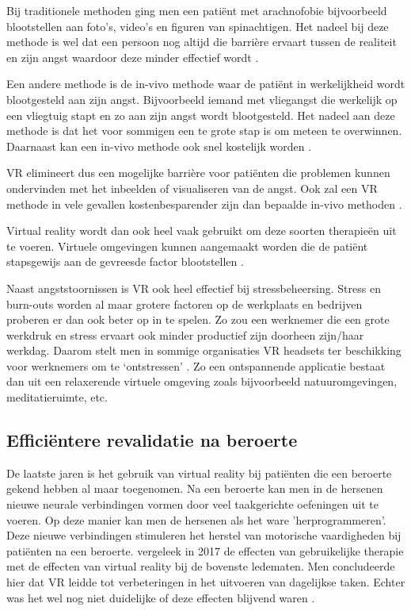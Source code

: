 Bij traditionele methoden ging men een patiënt met arachnofobie bijvoorbeeld blootstellen aan foto’s, video’s en figuren van spinachtigen. Het nadeel bij deze methode is wel dat een persoon nog altijd die barrière ervaart tussen de realiteit en zijn angst waardoor deze minder effectief wordt \autocite{Keller2018}.

Een andere methode is de in-vivo methode waar de patiënt in werkelijkheid wordt blootgesteld aan zijn angst. Bijvoorbeeld iemand met vliegangst die werkelijk op een vliegtuig stapt en zo aan zijn angst wordt blootgesteld. Het nadeel aan deze methode is dat het voor sommigen een te grote stap is om meteen te overwinnen. Daarnaast kan een in-vivo methode ook snel kostelijk worden \autocite{Keller2018}.

VR elimineert dus een mogelijke barrière voor patiënten die problemen kunnen ondervinden met het inbeelden of visualiseren van de angst. Ook zal een VR methode in vele gevallen kostenbesparender zijn dan bepaalde in-vivo methoden \autocite{Keller2018}.

Virtual reality wordt dan ook heel vaak gebruikt om deze soorten therapieën uit te voeren. Virtuele omgevingen kunnen aangemaakt worden die de patiënt stapsgewijs aan de gevreesde factor blootstellen \autocite{Keller2018}.

Naast angststoornissen is VR ook heel effectief bij stressbeheersing. Stress en burn-outs worden al maar grotere factoren op de werkplaats en bedrijven proberen er dan ook beter op in te spelen. Zo zou een werknemer die een grote werkdruk en stress ervaart ook minder productief zijn doorheen zijn/haar werkdag. Daarom stelt men in sommige organisaties VR headsets ter beschikking voor werknemers om te ‘ontstressen’ \autocite{Thoondee2017}.  
Zo een ontspannende applicatie bestaat dan uit een relaxerende virtuele omgeving zoals bijvoorbeeld natuuromgevingen, meditatieruimte, etc.

\subsection{Efficiëntere revalidatie na beroerte}  
De laatste jaren is het gebruik van virtual reality bij patiënten die een beroerte gekend hebben al maar toegenomen. Na een beroerte kan men in de hersenen nieuwe neurale verbindingen vormen door veel taakgerichte oefeningen uit te voeren. Op deze manier kan men de hersenen als het ware 'herprogrammeren'. Deze nieuwe verbindingen stimuleren het herstel van motorische vaardigheden bij patiënten na een beroerte. \textcite{Laver2017} vergeleek in 2017 de effecten van gebruikelijke therapie met de effecten van virtual reality bij de bovenste ledematen. Men concludeerde hier dat VR leidde tot verbeteringen in het uitvoeren van dagelijkse taken. Echter was het wel nog niet duidelijke of deze effecten blijvend waren \autocite{Laver2017}.

